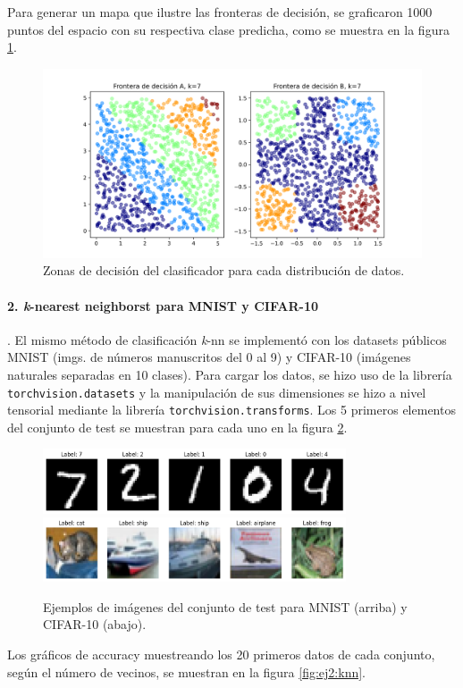\documentclass[a4paper,12pt]{article}
\begin{document}
Para generar un mapa que ilustre las fronteras de decisión, se graficaron 1000 puntos del espacio con su respectiva clase predicha, como se muestra en la figura \ref{fig:ej1:decision}.

\begin{figure}[!h]
    \centering
    \includegraphics[width=\textwidth]{ej1_zuniga_frontera.png}    
    \caption{Zonas de decisión del clasificador para cada distribución de datos. \label{fig:ej1:decision}}
\end{figure}

\paragraph{2. \textit{k}-nearest neighborst para MNIST y CIFAR-10}. El mismo método de clasificación \textit{k}-nn se implementó con los datasets públicos MNIST (imgs. de números manuscritos del 0 al 9) y CIFAR-10 (imágenes naturales separadas en 10 clases). Para cargar los datos, se hizo uso de la librería \texttt{torchvision.datasets} y la manipulación de sus dimensiones se hizo a nivel tensorial mediante la librería \texttt{torchvision.transforms}. Los 5 primeros elementos del conjunto de test se muestran para cada uno en la figura \ref{fig:ej2:ejemplos}.

\begin{figure}[!h]
    \centering
    \includegraphics[width=0.8\textwidth]{ej2_mnist_examples.png}
    \quad    
    \includegraphics[width=0.8\textwidth]{ej2_cifar_examples.png}
    \caption{Ejemplos de imágenes del conjunto de test para MNIST (arriba) y CIFAR-10 (abajo). \label{fig:ej2:ejemplos}}
\end{figure}
\newpage
Los gráficos de accuracy muestreando los 20 primeros datos de cada conjunto, según el número de vecinos, se muestran en la figura \ref{fig:ej2:knn}.
\end{document}
